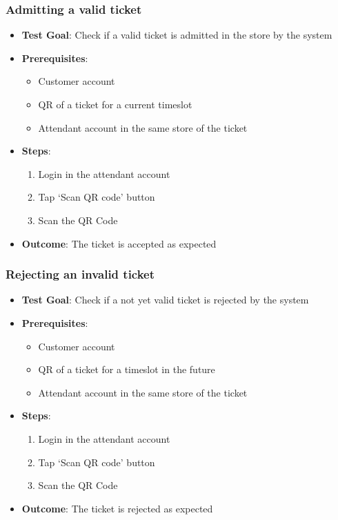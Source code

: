 \subsubsection{Admitting a valid ticket}
\begin{itemize}
    \item \textbf{Test Goal}: Check if a valid ticket is admitted in the store by the system
    \item \textbf{Prerequisites}:
    \begin{itemize}
        \item Customer account
        \item QR of a ticket for a current timeslot
        \item Attendant account in the same store of the ticket
    \end{itemize}
    \item \textbf{Steps}:
        \begin{enumerate}
            \item Login in the attendant account
            \item Tap `Scan QR code' button
            \item Scan the QR Code
        \end{enumerate}
    \item \textbf{Outcome}: The ticket is accepted as expected
\end{itemize}
\subsubsection{Rejecting an invalid ticket}
\begin{itemize}
    \item \textbf{Test Goal}: Check if a not yet valid ticket is rejected by the system
    \item \textbf{Prerequisites}: 
    \begin{itemize}
        \item Customer account
        \item QR of a ticket for a timeslot in the future
        \item Attendant account in the same store of the ticket
    \end{itemize}
    \item \textbf{Steps}:
        \begin{enumerate}
            \item Login in the attendant account
            \item Tap `Scan QR code' button
            \item Scan the QR Code
        \end{enumerate}
    \item \textbf{Outcome}: The ticket is rejected as expected
\end{itemize}


